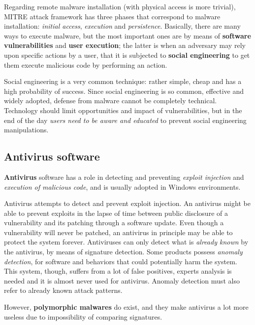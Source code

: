 \documentclass[10pt]{extbook}
\begin{document}
Regarding remote malware installation (with physical access is more trivial),
MITRE attack framework has three phases that correspond to malware
installation: \emph{initial access}, \emph{execution} and \emph{persistence}.
Basically, there are many ways to execute malware, but the most important ones
are by means of \textbf{software vulnerabilities} and \textbf{user execution};
the latter is when an adversary may rely upon specific actions by a user, that
it is subjected to \textbf{social engineering} to get them execute malicious
code by performing an action.

Social engineering is a very common technique: rather simple, cheap and has a
high probability of success. Since social engineering is so common, effective
and widely adopted, defense from malware cannot be completely technical.
Technology should limit opportunities and impact of vulnerabilities, but in the
end of the day \emph{users need to be aware and educated} to prevent social
engineering manipulations.

\subsection{Antivirus software}

\textbf{Antivirus} software has a role in detecting and preventing
\emph{exploit injection} and \emph{execution of malicious code}, and is usually
adopted in Windows environments.

Antivirus attempts to detect and prevent exploit injection. An antivirus might
be able to prevent exploits in the lapse of time between public disclosure of a
vulnerability and its patching through a software update. Even though a
vulnerability will never be patched, an antivirus in principle may be able to
protect the system forever. Antiviruses can only detect what is \emph{already
known} by the antivirus, by means of signature detection. Some products possess
\emph{anomaly detection}, for software and behaviors that could potentially
harm the system. This system, though, suffers from a lot of false positives,
experts analysis is needed and it is almost never used for antivirus. Anomaly
detection must also refer to already known attack patterns.

However, \textbf{polymorphic malwares} do exist, and they make antivirus
a lot more useless due to impossibility of comparing signatures.
\end{document}
